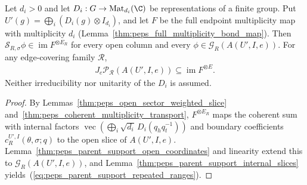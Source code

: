 \begin{lemma}%
    \label{thm:peps_parent_support_repeated_ranges}
    \leanok
    Let $d_i>0$ and let $D_i:G\to\operatorname{Mat}_{d_i}(\C)$ be
    representations of a finite group. Put
    $U'(g)=\bigoplus_i(D_i(g)\otimes I_{d_i})$, and let $F$ be the full
    endpoint multiplicity map with multiplicity $d_i$
    (Lemma~\ref{thm:peps_full_multiplicity_bond_map}). Then
    $\mathcal S_{R,\sigma}\phi\in\operatorname{im}F^{\otimes E_R}$ for every
    open column and every $\phi\in\mathcal G_R(A(U',I,e))$. For any
    edge-covering family $\mathcal R$,
    \begin{align}
        J_e\mathcal P_{\mathcal R}(A(U',I,e))
        \subseteq\operatorname{im}F^{\otimes E}.
        \label{eq:peps_parent_support_repeated_ranges}
    \end{align}
    Neither irreducibility nor unitarity of the $D_i$ is assumed.
\end{lemma}
\begin{proof}\leanok
    By Lemmas~\ref{thm:peps_open_sector_weighted_slice}
    and~\ref{thm:peps_coherent_multiplicity_transport}, $F^{\otimes E_R}$ maps
    the coherent sum with internal factors
    $\operatorname{vec}(\bigoplus_i\sqrt{d_i}\,D_i(q_hq_t^{-1}))$ and boundary
    coefficients $c_R^{U',I}(\theta,\sigma;q)$ to the open slice of $A(U',I,e)$.
    Lemma~\ref{thm:peps_parent_support_open_coordinates} and linearity extend
    this to $\mathcal G_R(A(U',I,e))$, and
    Lemma~\ref{thm:peps_parent_support_internal_slices} yields~(\ref{eq:peps_parent_support_repeated_ranges}).
\end{proof}

